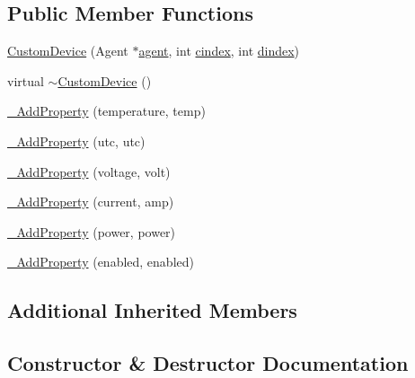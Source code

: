 \subsection*{Public Member Functions}
\begin{DoxyCompactItemize}
\item 
\hyperlink{classcubesat_1_1CustomDevice_a4f4beb9537b183cfad81ce08ebaea622}{Custom\+Device} (Agent $\ast$\hyperlink{classcubesat_1_1Device_a8499108eccaf7375bea8ead0182391a6}{agent}, int \hyperlink{classcubesat_1_1Device_a1deca725b01f8ef37e49662da6db4e53}{cindex}, int \hyperlink{classcubesat_1_1Device_a8a2b3d6d7400e6796c31705058172982}{dindex})
\item 
virtual \hyperlink{classcubesat_1_1CustomDevice_afd2d3db110cc3c67a635f2cdf76db81e}{$\sim$\+Custom\+Device} ()
\item 
\hyperlink{classcubesat_1_1CustomDevice_a2db96c92e03c4f4217e0217764fd4147}{\+\_\+\+Add\+Property} (temperature, temp)
\item 
\hyperlink{classcubesat_1_1CustomDevice_a44680935c5a224147a965fe97289d13c}{\+\_\+\+Add\+Property} (utc, utc)
\item 
\hyperlink{classcubesat_1_1CustomDevice_a3a15eff13cba7ca61bb845fdc2e26655}{\+\_\+\+Add\+Property} (voltage, volt)
\item 
\hyperlink{classcubesat_1_1CustomDevice_a99fcae6764531a5e3b8a7e5957704461}{\+\_\+\+Add\+Property} (current, amp)
\item 
\hyperlink{classcubesat_1_1CustomDevice_a08d07a6fd08acc7064301ea4d9f927a3}{\+\_\+\+Add\+Property} (power, power)
\item 
\hyperlink{classcubesat_1_1CustomDevice_adde28cab76c394ba807623d328bca1b1}{\+\_\+\+Add\+Property} (enabled, enabled)
\end{DoxyCompactItemize}
\subsection*{Additional Inherited Members}


\subsection{Constructor \& Destructor Documentation}
\mbox{\label{classcubesat_1_1CustomDevice_a4f4beb9537b183cfad81ce08ebaea622}} 
